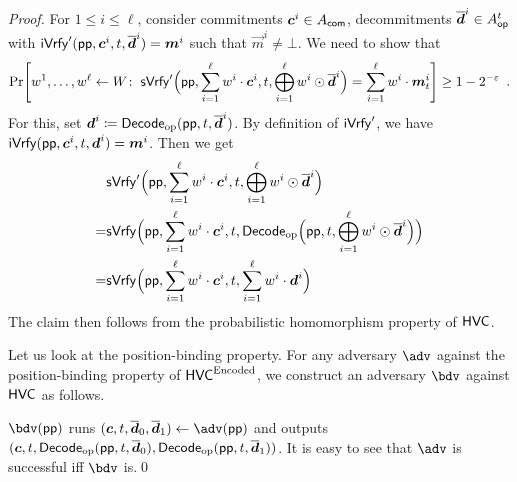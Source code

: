 \begin{proof}
For $1\leq i \leq \ell$, consider commitments $\boldsymbol{c}^i\in A_{\mathsf{com}}$, decommitments $\overline{\boldsymbol{d}}^i\in A_{\mathsf{op}}^{t}$ with $\mathsf{iVrfy}'(\mathsf{pp}, \boldsymbol{c}^i,t,\overline{\boldsymbol{d}}^i) = \boldsymbol{m}^i$ such that $\vec{m}^i\neq \bot$.
We need to show that 
\[
    \Pr\mleft[
      w^1,\dots,w^{\ell} \gets W\colon\;
      \sverify'\Bigl(\params,\sum_{i=1}^{\ell}w^i\cdot \vec{c}^i,t,\bigoplus_{i=1}^{\ell}w^i\odot\overline{\vec{d}}^i\Bigr)
      = \sum_{i=1}^{\ell}w^i\cdot\vec{m}^i_{t}
    \mright] \geq 1-2^{-\varepsilon}\enspace.
\]
For this, set $\boldsymbol{d}^i\coloneqq \mathsf{Decode}_{\mathrm{op}}(\mathsf{pp}, t, \overline{\boldsymbol{d}}^i)$. By definition of $\mathsf{iVrfy}'$, we have $\mathsf{iVrfy}(\mathsf{pp}, \boldsymbol{c}^i, t, \boldsymbol{d}^i) = \boldsymbol{m}^i$. Then we get
\begin{align*}
  &\mathsf{sVrfy}'\Bigl(\mathsf{pp},\sum_{i=1}^{\ell}w^i\cdot \boldsymbol{c}^i,t,                             \bigoplus_{i=1}^{\ell}w^i\odot\overline{\boldsymbol{d}}^i        \Bigr)\\
 =&\mathsf{sVrfy} \Bigl(\mathsf{pp},\sum_{i=1}^{\ell}w^i\cdot \boldsymbol{c}^i,t,\mathsf{Decode}_{\mathrm{op}}\Bigl(\mathsf{pp}, t, \bigoplus_{i=1}^{\ell}w^i\odot\overline{\boldsymbol{d}}^i \Bigr) \Bigr)\\
 =&\mathsf{sVrfy} \Bigl(\mathsf{pp},\sum_{i=1}^{\ell}w^i\cdot \boldsymbol{c}^i,t,                                  \sum_{i=1}^{\ell}w^i\cdot          \boldsymbol{d}^i         \Bigr)\\
\end{align*}
The claim then follows from the probabilistic homomorphism property of $\mathsf{HVC}$.

Let us look at the position-binding property. For any adversary $\adv$ against the position-binding property of $\mathsf{HVC}^{\textrm{Encoded}}$, we construct an adversary $\bdv$ against $\mathsf{HVC}$ as follows.

$\bdv(\params)$ runs $(\vec{c}, t, \overline{\vec{d}}_0,\overline{\vec{d}}_1)\gets\adv(\params)$ and outputs $(\boldsymbol{c}, t, \mathsf{Decode}_{\mathrm{op}}(\mathsf{pp}, t,\overline{\boldsymbol{d}}_0), \mathsf{Decode}_{\mathrm{op}}(\mathsf{pp}, t, \overline{\boldsymbol{d}}_1))$. It is easy to see that $\adv$ is successful iff $\bdv$ is.\qed
\end{proof}

